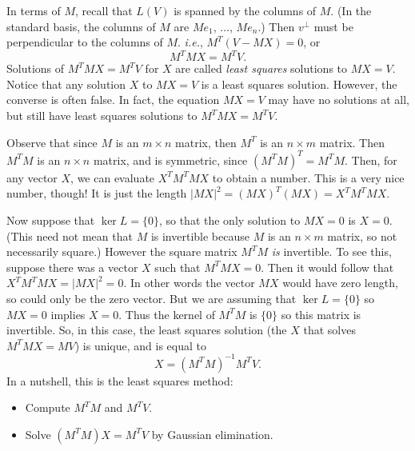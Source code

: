 In terms of $M$, recall that $L(V)$ is spanned by the columns of $M$.  (In the standard basis, the columns of $M$ are $Me_1$, 
$\ldots$, $Me_n$.)  Then $v^\perp$ must be perpendicular to the columns of $M$.  \textit{i.e.}, $M^T(V-MX)=0$, or
\[
M^TMX = M^TV.
\]
Solutions of $M^TMX = M^TV$ for $X$ are called \emph{least squares} solutions to $MX=V$.  
Notice that any solution $X$ to $MX=V$ is a least squares solution.  However, the converse is often false.  In fact, the equation $MX=V$ may have no solutions at all, but still have least squares solutions to $M^TMX = M^TV$.

Observe that since $M$ is an $m\times n$ matrix, then $M^T$ is an $n\times m$ matrix.  Then $M^TM$ is an $n\times n$ matrix, and is symmetric, since $(M^TM)^T=M^TM$.  Then, for any vector $X$, we can evaluate $X^TM^TMX$ to obtain a number.  This is a very nice number, though!  It is just the length $|MX|^2 = (MX)^T(MX)=X^TM^TMX$.


Now suppose that $\ker L=\{0\}$, so that the only solution to $MX=0$ is $X=0$. (This need not mean that $M$ is invertible because $M$ is an $n\times m $ matrix, so not necessarily square.) 
However the square matrix $M^TM$ {\itshape is} invertible. To see this, suppose there was a vector $X$ such that 
$M^T M X=0$. Then it would follow that $X^T M^T M X = |M X|^2=0$. In other words the vector $MX$ would have zero length, so could only be the zero vector. But we are assuming that $\ker L=\{0\}$ so $MX=0$ implies $X=0$. Thus the kernel of $M^TM$ is $\{0\}$ so this matrix is invertible.
So, in this case, the least squares solution (the $X$ that solves $M^TMX=MV$) is unique, and is equal to 
\[
X = (M^TM)^{-1}M^TV.
\]
In a nutshell, this is the least squares method:

\begin{itemize}
\item Compute $M^TM$ and $M^TV$.
\item Solve $(M^TM)X=M^TV$ by Gaussian elimination.
\end{itemize}


